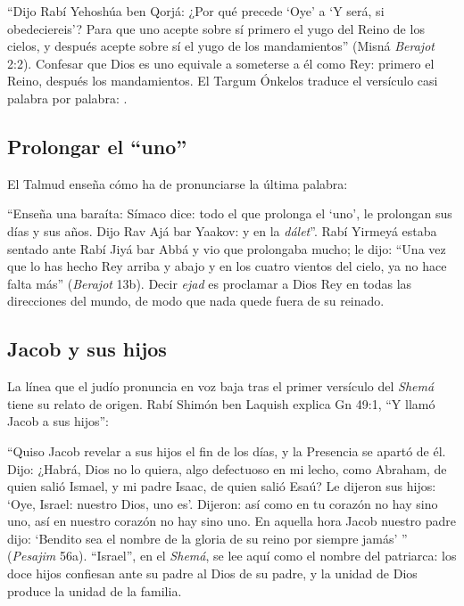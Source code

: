 
``Dijo Rabí Yehoshúa ben Qorjá: ¿Por qué precede `Oye' a `Y será, si obedeciereis'? Para que uno acepte sobre sí primero el yugo del Reino de los cielos, y después acepte sobre sí el yugo de los mandamientos'' (Misná \emph{Berajot} 2:2). Confesar que Dios es uno equivale a someterse a él como Rey: primero el Reino, después los mandamientos. El Targum Ónkelos traduce el versículo casi palabra por palabra: .

\subsection{Prolongar el “uno”}
El Talmud enseña cómo ha de pronunciarse la última palabra:


``Enseña una baraíta: Símaco dice: todo el que prolonga el `uno', le prolongan sus días y sus años. Dijo Rav Ajá bar Yaakov: y en la \emph{dálet}''. Rabí Yirmeyá estaba sentado ante Rabí Jiyá bar Abbá y vio que prolongaba mucho; le dijo: ``Una vez que lo has hecho Rey arriba y abajo y en los cuatro vientos del cielo, ya no hace falta más'' (\emph{Berajot} 13b). Decir \emph{ejad} es proclamar a Dios Rey en todas las direcciones del mundo, de modo que nada quede fuera de su reinado.

\subsection{Jacob y sus hijos}
La línea que el judío pronuncia en voz baja tras el primer versículo del \emph{Shemá} tiene su relato de origen. Rabí Shimón ben Laquish explica Gn 49:1, ``Y llamó Jacob a sus hijos'':


``Quiso Jacob revelar a sus hijos el fin de los días, y la Presencia se apartó de él. Dijo: ¿Habrá, Dios no lo quiera, algo defectuoso en mi lecho, como Abraham, de quien salió Ismael, y mi padre Isaac, de quien salió Esaú? Le dijeron sus hijos: `Oye, Israel: \SENOR{} nuestro Dios, \SENOR{} uno es'. Dijeron: así como en tu corazón no hay sino uno, así en nuestro corazón no hay sino uno. En aquella hora Jacob nuestro padre dijo: `Bendito sea el nombre de la gloria de su reino por siempre jamás' '' (\emph{Pesajim} 56a). ``Israel'', en el \emph{Shemá}, se lee aquí como el nombre del patriarca: los doce hijos confiesan ante su padre al Dios de su padre, y la unidad de Dios produce la unidad de la familia.

